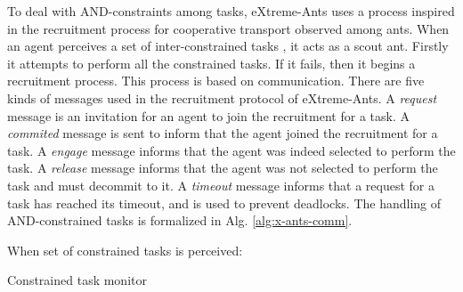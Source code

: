 To deal with AND-constraints among tasks, eXtreme-Ants uses a process inspired in the recruitment process for cooperative transport observed among ants. When an agent perceives a set of inter-constrained tasks \andtasks{}, it acts as a scout ant. Firstly it attempts to perform all the constrained tasks. If it fails, then it begins a recruitment process. This process is based on communication. There are five kinds of messages used in the recruitment protocol of eXtreme-Ants. A \textit{request} message is an invitation for an agent to join the recruitment for a task. A \textit{commited} message is sent to inform  that the agent joined the recruitment for a task. A \textit{engage} message informs that the agent was indeed selected to perform the task. A \textit{release} message informs that the agent was not selected to perform the task and must decommit to it. A \textit{timeout} message informs that a request for a task has reached its timeout, and is used to prevent deadlocks. The handling of AND-constrained tasks is formalized in Alg. \ref{alg:x-ants-comm}.


\begin{algorithm}[ht]
\begin{algorithmic}
\STATE When set of constrained tasks \andtasks{} is perceived:

%
\end{algorithmic}
\caption{Constrained task monitor}
\label{alg:x-ants-comm}
\end{algorithm}


%
%

